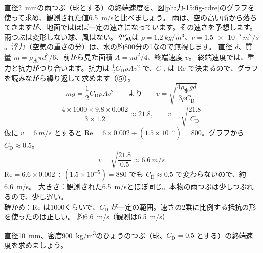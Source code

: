 \begin{phreidai}[雨つぶの終端速度]\label{ph:力-15:ex4}
直径\qty{2}{mm}の雨つぶ（球とする）の終端速度を、図\ref{ph:力-15:fig-cdre}のグラフを使って求め、観測された値\qty{6.5}{m/s}と比べましょう。
\phbamen
雨は、空の高い所から落ちてきますが、地面ではほぼ一定の速さになっています。その速さを予想します。
\phmushi
雨つぶは変形しない球、風はない。空気は $\rho=\qty{1.2}{kg/m^3}$、$\nu=\qty{1.5e-5}{m^2/s}$。浮力（空気の重さの分）は、水の約800分の1なので無視します。
\phzu
直径 $d$、質量 $m=\rho_{\text{水}}\pi d^3/6$、前から見た面積 $A=\pi d^2/4$、終端速度 $v$。
\phriyu
終端速度では、重力と抗力がつり合います。抗力は $\tfrac12C_{\mathrm D}\rho Av^2$ で、$C_{\mathrm D}$ は Re で決まるので、グラフを読みながら繰り返して求めます（⑤）。
\phtateru
\[mg=\frac{1}{2}C_{\mathrm D}\rho Av^2\qquad\text{より}\qquad v=\sqrt{\frac{4\rho_{\text{水}}gd}{3\rho C_{\mathrm D}}}\]
\phtoku
\[\frac{4\times1000\times9.8\times0.002}{3\times1.2}\approx21.8,\qquad v=\sqrt{\frac{21.8}{C_{\mathrm D}}}\]
仮に $v=\qty{6}{m/s}$ とすると $\mathrm{Re}=6\times0.002\div (1.5\times10^{-5})=800$。グラフから $C_{\mathrm D}\approx0.5$。
\[v=\sqrt{\frac{21.8}{0.5}}\approx\qty{6.6}{m/s}\]
$\mathrm{Re}=6.6\times0.002\div (1.5\times10^{-5})=880$ でも $C_{\mathrm D}\approx0.5$ で変わらないので、約\qty{6.6}{m/s}。
\phtashikame
大きさ：観測された\qty{6.5}{m/s}とほぼ同じ。本物の雨つぶは少しつぶれるので、少し遅い。\\
確かめ：Re は\num{1000}くらいで、$C_{\mathrm D}$ が一定の範囲。速さの2乗に比例する抵抗の形を使ったのは正しい。
\kotae 約\qty{6.6}{m/s}（観測は\qty{6.5}{m/s}）
\end{phreidai}
\begin{jibun}
直径\qty{10}{mm}、密度\qty{900}{kg/m^3}のひょうのつぶ（球、$C_{\mathrm D}=0.5$ とする）の終端速度を求めましょう。
\end{jibun}

